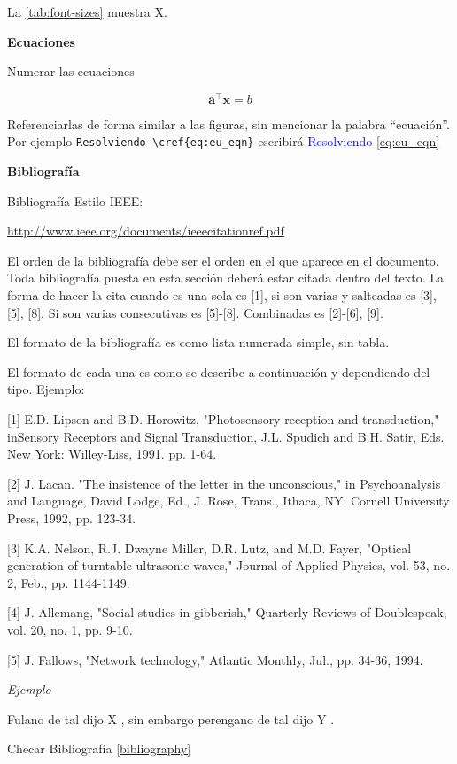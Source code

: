 La \cref{tab:font-sizes} muestra X. 

\textbf{Ecuaciones}

Numerar las ecuaciones

\begin{equation} \label{eq:eu_eqn}
\mathbf{a}^{\top}\mathbf{x} = b
\end{equation}

Referenciarlas de forma similar a las figuras, sin mencionar la palabra ``ecuación''. Por ejemplo \verb|Resolviendo \cref{eq:eu_eqn}| escribirá \textcolor{blue}{Resolviendo} \cref{eq:eu_eqn}


\textbf{Bibliografía}

Bibliografía Estilo IEEE: 

\url{http://www.ieee.org/documents/ieeecitationref.pdf } 

El orden de la bibliografía debe ser el orden en el que aparece en el documento. Toda bibliografía puesta en esta sección deberá estar citada dentro del texto. La forma de hacer la cita cuando es una sola es [1], si son varias y salteadas es [3], [5], [8]. Si son varias consecutivas es [5]-[8]. Combinadas es [2]-[6], [9]. 

El formato de la bibliografía es como lista numerada simple, sin tabla. 

El formato de cada una es como se describe a continuación y dependiendo del tipo. Ejemplo:

[1] E.D. Lipson and B.D. Horowitz, "Photosensory reception and transduction," inSensory Receptors and Signal Transduction, J.L. Spudich and B.H. Satir, Eds.  New York: Willey-Liss, 1991.  pp. 1-64. 

[2] J. Lacan.  "The insistence of the letter in the unconscious,"  in Psychoanalysis and Language, David Lodge, Ed., J. Rose, Trans.,  Ithaca, NY: Cornell University Press, 1992, pp. 123-34. 

[3] K.A. Nelson, R.J. Dwayne Miller, D.R. Lutz, and M.D. Fayer,  "Optical generation of turntable ultrasonic waves," Journal of Applied Physics, vol. 53, no. 2, Feb., pp. 1144-1149. 

[4] J. Allemang, "Social studies in gibberish," Quarterly Reviews of Doublespeak, vol. 20, no. 1, pp. 9-10.  

[5] J. Fallows, "Network technology," Atlantic Monthly, Jul.,  pp. 34-36, 1994. 


\textit{Ejemplo}

Fulano de tal dijo X \cite{Bringhurst2005}, sin embargo perengano de tal dijo Y \cite{Tufte1990}.

Checar Bibliografía \ref{bibliography}